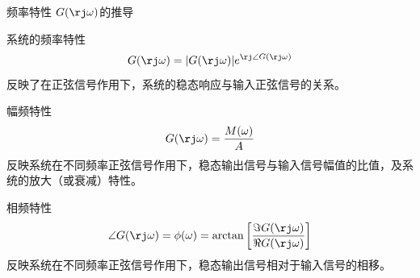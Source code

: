 \documentclass[handout,cjkutf8,table,aspectratio=1610]{beamer} %
\begin{document}
\begin{frame}{频率特性 $G(\rj\omega)$的推导}
	\vs{-1em}
	\begin{block}{系统的频率特性}
		$$G(\rj\omega) = |G(\rj\omega)|e^{\rj\angle G(\rj\omega)}$$
		反映了在正弦信号作用下，系统的\alert{稳态}响应与输入正弦信号的关系。
	\end{block}
	\begin{block}{幅频特性}
		\vs{-1em}
		$$G(\rj\omega)=\frac{M(\omega)}{A}$$
		反映系统在不同频率正弦信号作用下，稳态输出信号与\alert{输入信号幅值的比值}，及系统的放大（或衰减）特性。
	\end{block}
	\begin{block}{相频特性}
		\vs{-1em}
		$$\angle G(\rj\omega) = \phi(\omega) = \arctan\left[\frac{\Im G(\rj\omega)}{\Re G(\rj\omega)}\right]$$
		反映系统在不同频率正弦信号作用下，稳态输出信号\alert{相对于输入信号的相移}。
	\end{block}
\end{frame}
\end{document}
